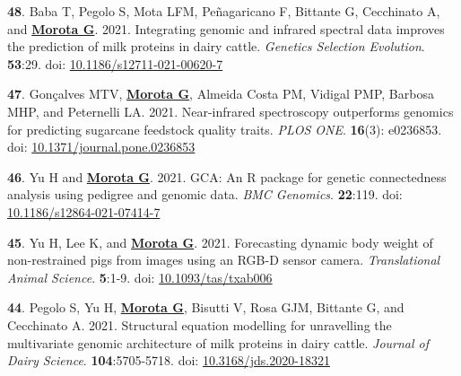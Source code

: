 \documentclass[margin,line,10pt]{res}
\newenvironment{list1}{
  \begin{list}{\ding{113}}{%
      \setlength{\itemsep}{0in}
      \setlength{\parsep}{0in} \setlength{\parskip}{0in}
      \setlength{\topsep}{0in} \setlength{\partopsep}{0in} 
      \setlength{\leftmargin}{0.17in}}}{\end{list}}
\begin{document}
\begin{resume}
\begin{list1}
    \vspace{0.5cm}

\item [{\bf 48}.] Baba T, Pegolo S, Mota LFM, Pe\~{n}agaricano F, Bittante G, Cecchinato A, and \textbf{\underline{Morota G}}. 2021. Integrating genomic and infrared spectral data improves the prediction of milk proteins in dairy cattle. \emph{Genetics Selection Evolution}. \textbf{53}:29. doi: \textcolor{blue}{\href{https://doi.org/10.1186/s12711-021-00620-7}{10.1186/s12711-021-00620-7}}
  
  \vspace{0.5cm}
  
\item [{\bf 47}.] Gon\c{c}alves MTV, \textbf{\underline{Morota G}}, Almeida Costa PM, Vidigal PMP, Barbosa MHP, and Peternelli LA. 2021. Near-infrared spectroscopy outperforms genomics for predicting sugarcane feedstock quality traits.  \emph{PLOS ONE}. \textbf{16}(3): e0236853. doi: \textcolor{blue}{\href{https://doi.org/10.1371/journal.pone.0236853}{10.1371/journal.pone.0236853}}

  \vspace{0.5cm}

  \item  [{\bf 46}.] Yu H and \textbf{\underline{Morota G}}. 2021. GCA: An R package for genetic connectedness analysis using pedigree and genomic data. \emph{BMC Genomics}. \textbf{22}:119.  doi: \textcolor{blue}{\href{https://doi.org/10.1186/s12864-021-07414-7}{10.1186/s12864-021-07414-7}}

  \vspace{0.5cm}

  
\item [{\bf 45}.] Yu H, Lee K, and \textbf{\underline{Morota G}}. 2021. Forecasting dynamic body weight of non-restrained pigs from images using an RGB-D sensor camera. \emph{Translational Animal Science}. \textbf{5}:1-9. doi: \textcolor{blue}{\href{https://doi.org/10.1093/tas/txab006}{10.1093/tas/txab006}} 

  \vspace{0.5cm}
  
\item [{\bf 44}.] Pegolo S, Yu H, \textbf{\underline{Morota G}}, Bisutti V, Rosa GJM, Bittante G, and Cecchinato A. 2021. Structural equation modelling for unravelling the multivariate genomic architecture of milk proteins in dairy cattle. \emph{Journal of Dairy Science}. \textbf{104}:5705-5718.  doi: \textcolor{blue}{\href{https://doi.org/10.3168/jds.2020-18321}{10.3168/jds.2020-18321}} 


\end{list1}
\end{resume}
\end{document}
